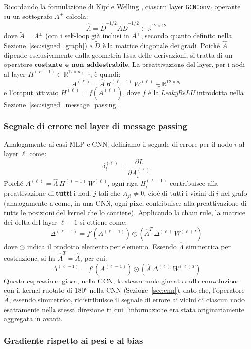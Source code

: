 Ricordando la formulazione di Kipf e Welling \cite{kipfwelling2017}, ciascun layer \texttt{GCNConv}$_\ell$ operante su un sottografo $A^{\pm}$ calcola:
\[
\hat{A} = \tilde D^{-1/2}\tilde A\tilde D^{-1/2}\in\mathbb{R}^{12\times12}
\]
dove $\tilde A=A^{\pm}$ (con i self-loop già inclusi in $A^+$, secondo quanto definito nella Sezione~\ref{sec:signed_graph}) e $\tilde D$ è la matrice diagonale dei gradi. Poiché $\hat{A}$ dipende esclusivamente dalla geometria fissa delle derivazioni, si tratta di un operatore \textbf{costante e non addestrabile}. La preattivazione del layer, per i nodi al layer $H^{(\ell-1)}\in\mathbb{R}^{12\times d_{\ell-1}}$, è quindi:
\[
A^{(\ell)}=\hat{A}\,H^{(\ell-1)}\,W^{(\ell)}\in\mathbb{R}^{12\times d_\ell}
\]
e l'output attivato $H^{(\ell)}=f\!\left(A^{(\ell)}\right)$, dove $f$ è la \emph{LeakyReLU} introdotta nella Sezione~\ref{sec:signed_message_passing}.

\subsubsection{Segnale di errore nel layer di message passing}

Analogamente ai casi MLP e CNN, definiamo il segnale di errore per il nodo $i$ al layer $\ell$ come:
\[
\delta_i^{(\ell)}=\frac{\partial L}{\partial A_i^{(\ell)}}
\]
Poiché $A^{(\ell)}=\hat{A}\,H^{(\ell-1)}\,W^{(\ell)}$, ogni riga $H_i^{(\ell-1)}$ contribuisce alla preattivazione di \textbf{tutti} i nodi $j$ tali che $\hat{A}_{ji}\neq 0$, cioè di tutti i vicini di $i$ nel grafo (analogamente a come, in una CNN, ogni pixel contribuisce alla preattivazione di tutte le posizioni del kernel che lo contiene). Applicando la chain rule, la matrice dei delta del layer $\ell-1$ si ottiene come:
\[
\Delta^{(\ell-1)} = f'\!\left(A^{(\ell-1)}\right)\odot\left(\hat{A}^T\,\Delta^{(\ell)}\,W^{(\ell)T}\right)
\]
dove $\odot$ indica il prodotto elemento per elemento. Essendo $\hat{A}$ simmetrica per costruzione, si ha $\hat{A}^T=\hat{A}$, per cui:
\[
\Delta^{(\ell-1)} = f'\!\left(A^{(\ell-1)}\right)\odot\left(\hat{A}\,\Delta^{(\ell)}\,W^{(\ell)T}\right)
\]
Questa espressione gioca, nella GCN, lo stesso ruolo giocato dalla convoluzione con il kernel ruotato di $180°$ nella CNN (Sezione~\ref{sec:cnn}), dato che, l'operatore $\hat A$, essendo simmetrico, ridistribuisce il segnale di errore ai vicini di ciascun nodo esattamente nella stessa direzione in cui l'informazione era stata originariamente aggregata in avanti.

\subsubsection{Gradiente rispetto ai pesi e al bias}

